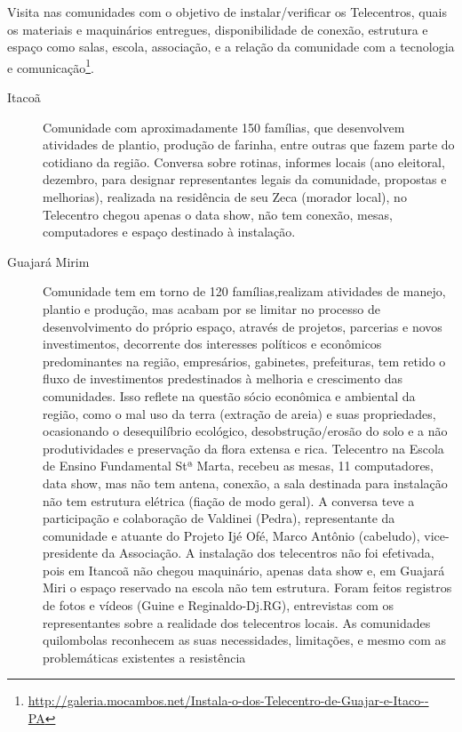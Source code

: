 \documentclass[a4paper, 11pt, oneside]{Relatorio_sem}  %
\begin{document}
Visita nas comunidades com o objetivo de instalar/verificar os
Telecentros, quais os materiais e maquinários entregues,
disponibilidade de conexão, estrutura e espaço como salas, escola,
associação, e a relação da comunidade com a tecnologia e
comunicação\footnote{\url{http://galeria.mocambos.net/Instala-o-dos-Telecentro-de-Guajar-e-Itaco--PA}}.
\begin{description}
  \item[Itacoã] Comunidade com aproximadamente 150 famílias, que
    desenvolvem atividades de plantio, produção de farinha, entre
    outras que fazem parte do cotidiano da região. Conversa sobre
    rotinas, informes locais (ano eleitoral, dezembro, para designar
    representantes legais da comunidade, propostas e melhorias),
    realizada na residência de seu Zeca (morador local), no Telecentro
    chegou apenas o data show, não tem conexão, mesas, computadores e
    espaço destinado à instalação.
  \item[Guajará Mirim] Comunidade tem em torno de 120 famílias,realizam
    atividades de manejo, plantio e produção, mas acabam por se
    limitar no processo de desenvolvimento do próprio espaço, através
    de projetos, parcerias e novos investimentos, decorrente dos
    interesses políticos e econômicos predominantes na região,
    empresários, gabinetes, prefeituras, tem retido o fluxo de
    investimentos predestinados à melhoria e crescimento das
    comunidades. Isso reflete na questão sócio econômica e ambiental
    da região, como o mal uso da terra (extração de areia) e suas
    propriedades, ocasionando o desequilíbrio ecológico,
    desobstrução/erosão do solo e a não produtividades e preservação
    da flora extensa e rica.  Telecentro na Escola de Ensino
    Fundamental Stª Marta, recebeu as mesas, 11 computadores, data
    show, mas não tem antena, conexão, a sala destinada para
    instalação não tem estrutura elétrica (fiação de modo geral). A
    conversa teve a participação e colaboração de Valdinei (Pedra),
    representante da comunidade e atuante do Projeto Ijé Ofé, Marco
    Antônio (cabeludo), vice-presidente da Associação.  A instalação
    dos telecentros não foi efetivada, pois em Itancoã não chegou
    maquinário, apenas data show e, em Guajará Miri o espaço reservado
    na escola não tem estrutura. Foram feitos registros de fotos e
    vídeos (Guine e Reginaldo-Dj.RG), entrevistas com os
    representantes sobre a realidade dos telecentros locais. As
    comunidades quilombolas reconhecem as suas necessidades,
    limitações, e mesmo com as problemáticas existentes a resistência

\end{description}
\end{document}
